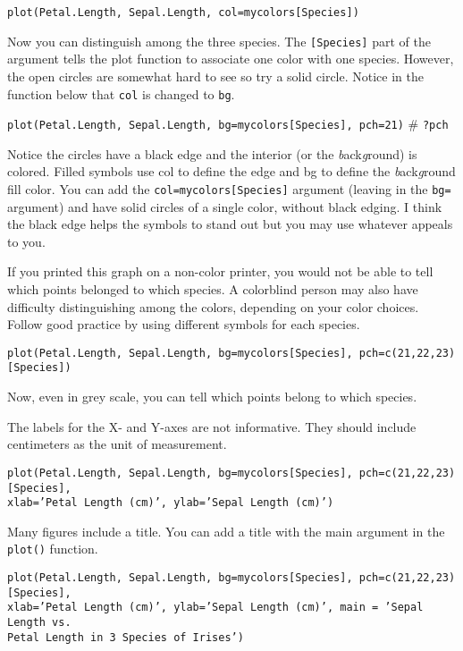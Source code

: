 \documentclass[11pt]{article}
\begin{document}
\texttt{plot(Petal.Length, Sepal.Length, col=mycolors{[}Species{]})}

Now you can distinguish among the three species. The \texttt{{[}Species{]}} part
of the argument tells the plot function to associate one color with one
species. However, the open circles are somewhat hard to see so try a
solid circle. Notice in the function below that \texttt{col} is changed to \texttt{bg}.

\texttt{plot(Petal.Length, Sepal.Length, bg=mycolors{[}Species{]}, pch=21)} \#
\texttt{?pch}

Notice the circles have a black edge and the interior (or the
\emph{b}ack\emph{g}round) is colored. Filled symbols use col to define
the edge and bg to define the \emph{b}ack\emph{g}round fill color. You
can add the \texttt{col=mycolors{[}Species{]}} argument (leaving in the \texttt{bg=}
argument) and have solid circles of a single color, without black
edging. I think the black edge helps the symbols to stand out but you
may use whatever appeals to you.

If you printed this graph on a non-color printer, you would not be able
to tell which points belonged to which species. A colorblind person may
also have difficulty distinguishing among the colors, depending on your
color choices. Follow good practice by using different symbols for each
species. 

\texttt{plot(Petal.Length, Sepal.Length, bg=mycolors{[}Species{]},
pch=c(21,22,23){[}Species{]})}

Now, even in grey scale, you can tell which points belong to which
species.

The labels for the X- and Y-axes are not informative. They should
include centimeters as the unit of measurement.

\texttt{plot(Petal.Length, Sepal.Length, bg=mycolors{[}Species{]},
pch=c(21,22,23){[}Species{]}, \\xlab='Petal Length (cm)', ylab='Sepal
Length (cm)')}

Many figures include a title. You can add a title with the main argument
in the \texttt{plot()} function.

\texttt{plot(Petal.Length, Sepal.Length, bg=mycolors{[}Species{]}, pch=c(21,22,23){[}Species{]}, \\
xlab='Petal Length (cm)', ylab='Sepal Length (cm)', main = 'Sepal Length vs. \\
Petal Length in 3 Species of Irises')}

\end{document}
